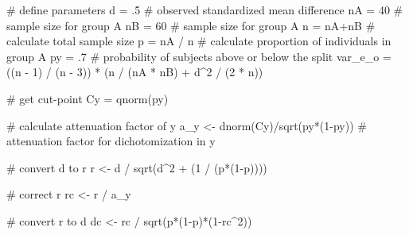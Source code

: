 \documentclass[
  letterpaper,
  DIV=11,
  numbers=noendperiod]{scrreprt}
\newenvironment{Shaded}{\begin{snugshade}}{\end{snugshade}}
\newcommand{\CommentTok}[1]{\textcolor[rgb]{0.37,0.37,0.37}{#1}}
\newcommand{\DecValTok}[1]{\textcolor[rgb]{0.68,0.00,0.00}{#1}}
\newcommand{\FunctionTok}[1]{\textcolor[rgb]{0.28,0.35,0.67}{#1}}
\newcommand{\NormalTok}[1]{\textcolor[rgb]{0.00,0.23,0.31}{#1}}
\newcommand{\OtherTok}[1]{\textcolor[rgb]{0.00,0.23,0.31}{#1}}
\newcommand{\SpecialCharTok}[1]{\textcolor[rgb]{0.37,0.37,0.37}{#1}}
\begin{document}
\begin{Shaded}
\begin{Highlighting}[]
\CommentTok{\# define parameters}
\NormalTok{d }\OtherTok{=}\NormalTok{ .}\DecValTok{5} \CommentTok{\# observed standardized mean difference}
\NormalTok{nA }\OtherTok{=} \DecValTok{40}  \CommentTok{\# sample size for group A}
\NormalTok{nB }\OtherTok{=} \DecValTok{60}  \CommentTok{\# sample size for group A}
\NormalTok{n }\OtherTok{=}\NormalTok{ nA}\SpecialCharTok{+}\NormalTok{nB }\CommentTok{\# calculate total sample size}
\NormalTok{p }\OtherTok{=}\NormalTok{ nA }\SpecialCharTok{/}\NormalTok{ n }\CommentTok{\# calculate proportion of individuals in group A}
\NormalTok{py }\OtherTok{=}\NormalTok{ .}\DecValTok{7} \CommentTok{\# probability of subjects above or below the split}
\NormalTok{var\_e\_o }\OtherTok{=}\NormalTok{ ((n }\SpecialCharTok{{-}} \DecValTok{1}\NormalTok{) }\SpecialCharTok{/}\NormalTok{ (n }\SpecialCharTok{{-}} \DecValTok{3}\NormalTok{)) }\SpecialCharTok{*}\NormalTok{ (n }\SpecialCharTok{/}\NormalTok{ (nA }\SpecialCharTok{*}\NormalTok{ nB) }\SpecialCharTok{+}\NormalTok{ d}\SpecialCharTok{\^{}}\DecValTok{2} \SpecialCharTok{/}\NormalTok{ (}\DecValTok{2} \SpecialCharTok{*}\NormalTok{ n))}

\CommentTok{\# get cut{-}point}
\NormalTok{Cy }\OtherTok{=} \FunctionTok{qnorm}\NormalTok{(py)}

\CommentTok{\# calculate attenuation factor of y}
\NormalTok{a\_y }\OtherTok{\textless{}{-}} \FunctionTok{dnorm}\NormalTok{(Cy)}\SpecialCharTok{/}\FunctionTok{sqrt}\NormalTok{(py}\SpecialCharTok{*}\NormalTok{(}\DecValTok{1}\SpecialCharTok{{-}}\NormalTok{py)) }\CommentTok{\# attenuation factor for dichotomization in y}

\CommentTok{\# convert d to r}
\NormalTok{r }\OtherTok{\textless{}{-}}\NormalTok{ d }\SpecialCharTok{/} \FunctionTok{sqrt}\NormalTok{(d}\SpecialCharTok{\^{}}\DecValTok{2} \SpecialCharTok{+}\NormalTok{ (}\DecValTok{1} \SpecialCharTok{/}\NormalTok{ (p}\SpecialCharTok{*}\NormalTok{(}\DecValTok{1}\SpecialCharTok{{-}}\NormalTok{p))))}

\CommentTok{\# correct r}
\NormalTok{rc }\OtherTok{\textless{}{-}}\NormalTok{ r }\SpecialCharTok{/}\NormalTok{ a\_y}

\CommentTok{\# convert r to d}
\NormalTok{dc }\OtherTok{\textless{}{-}}\NormalTok{ rc }\SpecialCharTok{/} \FunctionTok{sqrt}\NormalTok{(p}\SpecialCharTok{*}\NormalTok{(}\DecValTok{1}\SpecialCharTok{{-}}\NormalTok{p)}\SpecialCharTok{*}\NormalTok{(}\DecValTok{1}\SpecialCharTok{{-}}\NormalTok{rc}\SpecialCharTok{\^{}}\DecValTok{2}\NormalTok{))}


\end{Highlighting}
\end{Shaded}
\end{document}
